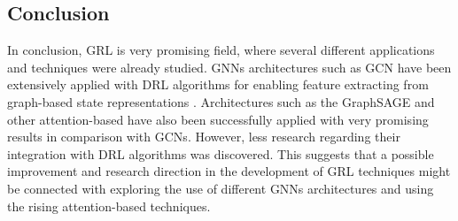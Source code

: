 \documentclass[11pt,a4paper]{article}
\begin{document}
\begin{comment}
GCN

\cite{yanGraphCooperationDeep2023} & GCN-DQN & GRU, Multi-agent and Multi-head Attention & Ecological Traffic Signal Control \\ \hline

\cite{luoMultiAgentCollaborativeExploration2019} & GCN-DQN & & Autonomous Exploration under uncertainty \\ \hline

Attention
\cite{huMultiagentGraphReinforcement2024} & HRGN-MASAC & Multi-agent Vol-VAR Regulation \\ \hline

\end{comment}

\subsection{Conclusion}

In conclusion, \ac{GRL} is very promising field, where several different applications and techniques were already studied. \acp{GNN} architectures such as \ac{GCN} have been extensively applied with DRL algorithms for enabling feature extracting from graph-based state representations \cite{chenScalableGraphReinforcement2023, chenAutonomousExplorationUncertainty2020}. Architectures such as the GraphSAGE and other attention-based have also been successfully applied with very promising results \cite{peiEmergencyControlStrategy2023, xingRealtimeOptimalScheduling2023} in comparison with \acp{GCN}. However, less research regarding their integration with DRL algorithms was discovered. This suggests that a possible improvement and research direction in the development of \ac{GRL} techniques might be connected with exploring the use of different \acp{GNN} architectures and using the rising attention-based techniques.





\end{document}

